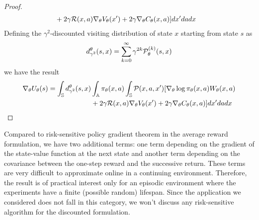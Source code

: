 \begin{proof}
\begin{equation*}
\begin{split}
						&+ 2 \gamma \mathcal{R}(x,a) \nabla_\theta V_\theta(x') + 2 \gamma \nabla_\theta C_\theta(x, a)]  dx' da dx
		\end{split}
	\end{equation*} 
	Defining the $\gamma^2$-discounted visiting distribution of state $x$ starting from state $s$ as
	\begin{equation*}
		d_{\gamma^2}^\theta(s, x) = \sum_{k=0}^{\infty} \gamma^{2k} \mathcal{P}_\theta^{(k)}(s, x)
	\end{equation*}
	we have the result
	\begin{equation*}
		\begin{split}
			\begin{split}
				\nabla_\theta U_\theta(s) = \int_{\mathbb{S}} d_{\gamma^2}^\theta(s, x) &\int_{\mathbb{A}} \pi_\theta(x,a) \int_{\mathbb{S}} \mathcal{P}(x,a,x') [\nabla_\theta \log \pi_\theta(x,a) W_\theta(x,a)\\ 
							&+ 2 \gamma \mathcal{R}(x,a) \nabla_\theta V_\theta(x') + 2 \gamma \nabla_\theta C_\theta(x, a)]  dx' da dx
			\end{split}
		\end{split}
	\end{equation*} 
\end{proof}
Compared to risk-sensitive policy gradient theorem in the average reward formulation, we have two additional terms: one term depending on the gradient of the state-value function at the next state and another term depending on the covariance between the one-step reward and the successive return. These terms are very difficult to approximate online in a continuing environment. Therefore, the result is of practical interest only for an episodic environment where the experiments have a finite (possible random) lifespan. Since the application we considered does not fall in this category, we won't discuss any risk-sensitive algorithm for the discounted formulation. 
